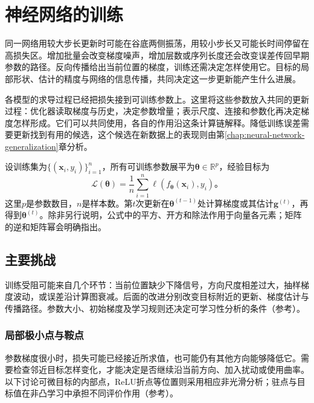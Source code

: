 \chapter{神经网络的训练}
\label{chap:neural-network-training}

同一网络用较大步长更新时可能在谷底两侧振荡，用较小步长又可能长时间停留在高损失区。增加批量会改变梯度噪声，增加层数或序列长度还会改变误差传回早期参数的路径。反向传播给出当前位置的梯度，训练还需决定怎样使用它。目标的局部形状、估计的精度与网络的信息传播，共同决定这一步更新能产生什么进展。

各模型的求导过程已经把损失接到可训练参数上。这里将这些参数放入共同的更新过程：优化器读取梯度与历史，决定参数增量；表示尺度、连接和参数化再决定梯度怎样形成。它们可以共同使用，各自的作用沿这条计算链解释。降低训练误差需要更新找到有用的候选，这个候选在新数据上的表现则由第\ref{chap:neural-network-generalization}章分析。

设训练集为$\{(\bm x_i,y_i)\}_{i=1}^n$，所有可训练参数展平为$\bm\theta\in\mathbb R^p$，经验目标为
\begin{equation}
  \mathcal L(\bm\theta)=\frac1n\sum_{i=1}^n
  \ell(f_{\bm\theta}(\bm x_i),y_i)\text{。}
  \label{eq:training-objective}
\end{equation}
这里$p$是参数数目，$n$是样本数。第$t$次更新在$\bm\theta^{(t-1)}$处计算梯度或其估计$\bm g^{(t)}$，再得到$\bm\theta^{(t)}$。除非另行说明，公式中的平方、开方和除法作用于向量各元素；矩阵的逆和矩阵幂会明确指出。

\section{主要挑战}
\label{sec:training-challenges}

训练受阻可能来自几个环节：当前位置缺少下降信号，方向尺度相差过大，抽样梯度波动，或误差沿计算图衰减。后面的改进分别改变目标附近的更新、梯度估计与传播路径。参数大小、初始梯度及学习规则还决定可学习性分析的条件（参考）。

\subsection{局部极小点与鞍点}
\label{sec:training-stationary-points}

参数梯度很小时，损失可能已经接近所求值，也可能仍有其他方向能够降低它。需要检查邻近目标怎样变化，才能决定是否继续沿当前方向、加入扰动或使用曲率。以下讨论可微目标的内部点，ReLU折点等位置则采用相应非光滑分析；驻点与目标值在非凸学习中承担不同评价作用（参考）。

